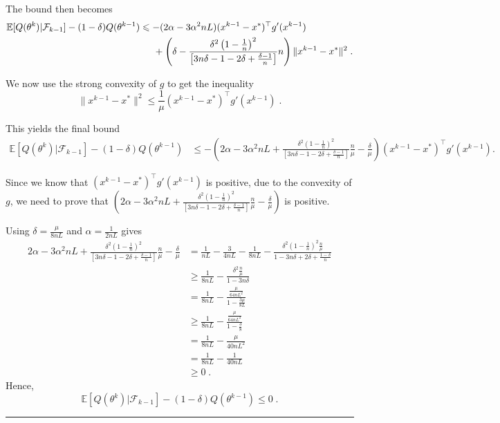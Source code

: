 \documentclass{article}
\newcommand{\BlackBox}{\rule{1.5ex}{1.5ex}}  %
\newenvironment{proof}{\par\noindent{\bf Proof\ }}{\hfill\BlackBox\\[2mm]}
\def\E{_{\scriptscriptstyle E}}
\def \E{{\mathbb E}}
\def \E{{\mathbb E}}
\begin{document}
\begin{proof}
The bound then becomes
\begin{align*}
\E [ Q(\theta^k) | \mathcal{F}_{k-1} ]  - (1 - \delta)Q(\theta^{k-1}) &\leqslant - ( 2 \alpha - 3 \alpha^2 n L ) (x^{k-1} -x^\ast)^\top g'(x^{k-1})\\
&\hspace*{.5cm} + \left(\delta - \frac{\delta^2\left(1-\frac{1}{n}\right)^2}{\left[3n\delta - 1- 2\delta + \frac{\delta - 1}{n}\right]}n\right) \|x^{k-1} -x^\ast\|^2 \; .
\end{align*}

We now use the strong convexity of $g$ to get the inequality
\[
\|x^{k-1} -x^\ast\|^2 \leqslant \frac{1}{\mu}(x^{k-1} -x^\ast)^\top g'(x^{k-1}) \; .
\]

This yields the final bound
\begin{align*}
\E [ Q(\theta^k) | \mathcal{F}_{k-1} ]  - (1 - \delta)Q(\theta^{k-1}) &\leqslant - \left( 2 \alpha - 3 \alpha^2 n L + \frac{\delta^2\left(1-\frac{1}{n}\right)^2}{\left[3n\delta - 1- 2\delta + \frac{\delta - 1}{n}\right]}\frac{n}{\mu} - \frac{\delta}{\mu} \right) (x^{k-1} -x^\ast)^\top g'(x^{k-1}).
\end{align*}

Since we know that $(x^{k-1} -x^\ast)^\top g'(x^{k-1})$ is positive, due to the convexity of $g$, we need to prove that $\displaystyle \left( 2 \alpha - 3 \alpha^2 n L + \frac{\delta^2\left(1-\frac{1}{n}\right)^2}{\left[3n\delta - 1- 2\delta + \frac{\delta - 1}{n}\right]}\frac{n}{\mu} - \frac{\delta}{\mu} \right)$ is positive.

Using $\delta = \frac{\mu}{8 n L}$ and $\alpha = \frac{1}{2nL}$ gives
\begin{align*}
2 \alpha - 3 \alpha^2 n L + \frac{\delta^2\left(1-\frac{1}{n}\right)^2}{\left[3n\delta - 1- 2\delta + \frac{\delta - 1}{n}\right]}\frac{n}{\mu} - \frac{\delta}{\mu} &= \frac{1}{nL} - \frac{3}{4nL} - \frac{1}{8nL} - \frac{\delta^2\left(1-\frac{1}{n}\right)^2\frac{n}{\mu}}{1 - 3n\delta + 2\delta + \frac{1 - \delta}{n}}\\
&\geqslant \frac{1}{8nL} - \frac{\delta^2\frac{n}{\mu}}{1 - 3n\delta}\\
&= \frac{1}{8nL} - \frac{\frac{\mu}{64nL^2}}{1 - \frac{3\mu}{8L}}\\
&\geqslant \frac{1}{8nL} - \frac{\frac{\mu}{64nL^2}}{1 - \frac{3}{8}}\\
&= \frac{1}{8nL} - \frac{\mu}{40nL^2}\\
&= \frac{1}{8nL} - \frac{1}{40nL}\\
& \geqslant 0 \; .
\end{align*}
Hence,
\[
\E [ Q(\theta^k) | \mathcal{F}_{k-1} ]  - (1 - \delta)Q(\theta^{k-1}) \leqslant 0 \; .
\]


\end{proof}
\end{document}
